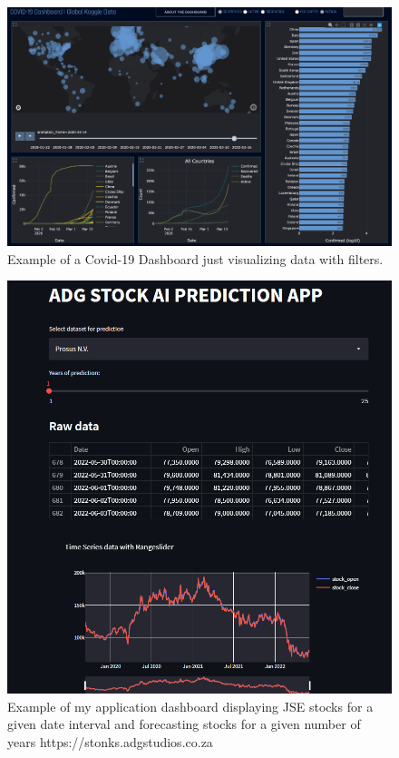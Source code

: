 \begin{figure}
    \includegraphics[width=\linewidth]{images/covid19dashboard.png}
    \caption{Example of a Covid-19 Dashboard just visualizing data with filters.}
    \label{fig:covid19dashboard}
\end{figure}

\begin{figure}
    \includegraphics[width=\linewidth]{images/stonkapppt1.png}
    \caption{Example of my application dashboard displaying JSE stocks for a given date interval and forecasting stocks for a given number of years https://stonks.adgstudios.co.za}
    \label{fig:stonkapppt1}
\end{figure}

